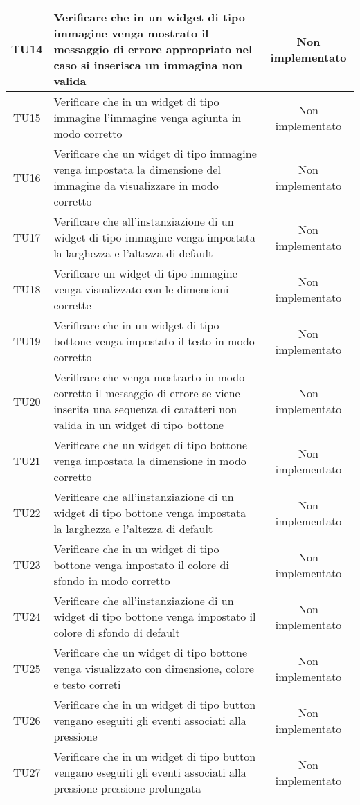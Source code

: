 \begin{center}
\begin{longtable}{|c|>{\centering}m{10cm}|c|}
		TU14 & Verificare che in un widget di tipo immagine venga mostrato il messaggio di errore appropriato nel caso si inserisca un immagina non valida & Non implementato \\ \hline
		TU15 & Verificare che in un widget di tipo immagine l'immagine venga agiunta in modo corretto & Non implementato \\ \hline
		TU16 & Verificare che un widget di tipo immagine venga impostata la dimensione del immagine da visualizzare in modo corretto & Non implementato \\ \hline
		TU17 & Verificare che all'instanziazione di un widget di tipo immagine venga impostata la larghezza e l'altezza di default & Non implementato \\ \hline
		TU18 & Verificare un widget di tipo immagine venga visualizzato con le dimensioni corrette & Non implementato \\ \hline
		TU19 & Verificare che in un widget di tipo bottone venga impostato il testo in modo corretto & Non implementato \\ \hline
		TU20 & Verificare che venga mostrarto in modo corretto il messaggio di errore se viene inserita una sequenza di caratteri non valida in un widget di tipo bottone & Non implementato \\ \hline
		TU21 & Verificare che un widget di tipo bottone venga impostata la dimensione in modo corretto & Non implementato \\ \hline
		TU22 & Verificare che all'instanziazione di un widget di tipo bottone venga impostata la larghezza e l'altezza di default & Non implementato \\ \hline
		TU23 & Verificare che in un widget di tipo bottone venga impostato il colore di sfondo in modo corretto & Non implementato \\ \hline
		TU24 & Verificare che all'instanziazione di un widget di tipo bottone venga impostato il colore di sfondo di default & Non implementato \\ \hline
		TU25 & Verificare che un widget di tipo bottone venga visualizzato con dimensione, colore e testo correti & Non implementato \\ \hline
		TU26 & Verificare che in un widget di tipo button vengano eseguiti gli eventi associati alla pressione & Non implementato \\ \hline
		TU27 & Verificare che in un widget di tipo button vengano eseguiti gli eventi associati alla pressione pressione prolungata & Non implementato \\ \hline

\end{longtable}
\end{center}
